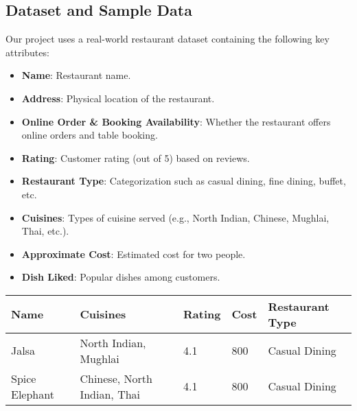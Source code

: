 \documentclass[fontsize=11pt]{article}
\begin{document}
\subsection*{Dataset and Sample Data}
Our project uses a real-world restaurant dataset containing the following key attributes:
\begin{itemize}
    \item \textbf{Name}: Restaurant name.
    \item \textbf{Address}: Physical location of the restaurant.
    \item \textbf{Online Order \& Booking Availability}: Whether the restaurant offers online orders and table booking.
    \item \textbf{Rating}: Customer rating (out of 5) based on reviews.
    \item \textbf{Restaurant Type}: Categorization such as casual dining, fine dining, buffet, etc.
    \item \textbf{Cuisines}: Types of cuisine served (e.g., North Indian, Chinese, Mughlai, Thai, etc.).
    \item \textbf{Approximate Cost}: Estimated cost for two people.
    \item \textbf{Dish Liked}: Popular dishes among customers.
\end{itemize}

\begin{tabular}{|l|l|l|l|l|}
    \hline
    \textbf{Name} & \textbf{Cuisines} & \textbf{Rating} & \textbf{Cost} & \textbf{Restaurant Type} \\
    \hline
    Jalsa & North Indian, Mughlai & 4.1 & 800 & Casual Dining \\
    \hline
    Spice Elephant & Chinese, North Indian, Thai & 4.1 & 800 & Casual Dining \\
    \hline
\end{tabular}
\end{document}
